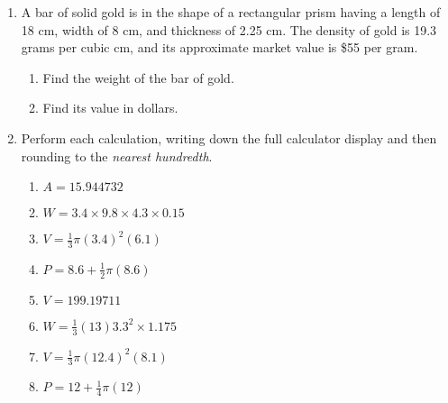 \documentclass[12pt, twoside]{article}
\begin{document}
\begin{enumerate}
  \item A bar of solid gold is in the shape of a rectangular prism having a length of 18 cm, width of 8 cm, and thickness of 2.25 cm. The density of gold is 19.3 grams per cubic cm, and its approximate market value is \$55 per gram.
  \begin{enumerate}
    \item Find the weight of the bar of gold.  \vspace{3cm}
    \item Find its value in dollars.
  \end{enumerate}

\newpage
  \item Perform each calculation, writing down the full calculator display and then rounding to the \emph{nearest hundredth}.
    \begin{multicols}{2}
    \begin{enumerate}[itemsep=4cm]
      \item $A=15.944732$
      \item $W=3.4 \times 9.8 \times 4.3 \times 0.15$
            
      \item $V=\frac{1}{3} \pi (3.4)^2(6.1)$
      \item $P=8.6 + \frac{1}{2} \pi (8.6)$  
      \item $V=199.19711$
      \item $W=\frac{1}{3} (13)  3.3^2 \times 1.175$
      \item $V=\frac{1}{3} \pi (12.4)^2(8.1)$
      \item $P=12 + \frac{1}{4} \pi (12)$ 
    \end{enumerate}
    \end{multicols}\vspace{2cm}


\end{enumerate}
\end{document}
